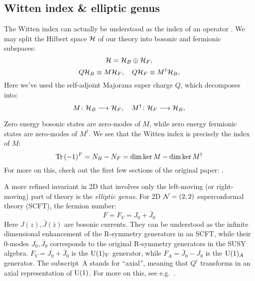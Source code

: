 \documentclass[a4paper
	,10pt
]{article}
\begin{document}
\subsection{Witten index \& elliptic genus}
	
	The Witten index can actually be understood as the index of an operator \cite{Witten:1982df}. We may split the Hilbert space $\mathcal{H}$ of our theory into bosonic and fermionic subspaces:
	\begin{equation}
		\mathcal{H} = \mathcal{H}_B \oplus \mathcal{H}_F,
	\end{equation}
	\vspace{-\baselineskip}
	\begin{equation}
		Q\mathcal{H}_B \equiv M\mathcal{H}_F,
	\quad
		Q\mathcal{H}_F \equiv M^\dagger\mathcal{H}_B,
	\end{equation}
	Here we've used the self-adjoint Majorana super charge $Q$, which decomposes into:
	\begin{equation}
		M\colon \mathcal{H}_B \longrightarrow \mathcal{H}_F,
	\quad
		M^\dagger\colon \mathcal{H}_F \longrightarrow \mathcal{H}_B,
	\end{equation}
	
	Zero energy bosonic states are zero-modes of $M$, while zero energy fermionic states are zero-modes of $M^\dagger$. We see that the Witten index is precisely the index of $M$:
	\begin{equation}
		\Tr\,(-1)^F
		= N_B - N_F
		= \dim \ker M - \dim \ker M^\dagger
	\end{equation}
	For more on this, check out the first few sections of the original paper: \textcite{Witten:1982df}. 
	
	\newparagraph
	A more refined invariant in 2D that involves only the left-moving (or right-moving) part of theory is the \textit{elliptic genus}. For 2D $\mathcal{N} = (2,2)$ superconformal theory (SCFT), the fermion number:
	\begin{equation}
		F = F_V = J_0 + \bar{J}_0
	\end{equation}
	Here $J(z),\bar{J}(\bar{z})$ are bosonic currents. They can be understood as the infinite dimensional enhancement of the R-symmetry generators in an SCFT, while their 0-modes $J_0,\bar{J}_0$ corresponds to the original R-symmetry generators in the SUSY algebra. $F_V = J_0 + \bar{J}_0$ is the $\mathrm{U}(1)_V$ generator, while $F_A = \bar{J}_0 - J_0$ is the $\mathrm{U}(1)_A$ generator. The \mbox{subscript A} stands for ``axial'', meaning that $Q^i$ transforms in an axial representation of $\mathrm{U}(1)$. For more on this, see e.g.~\cite{MauricioStuff}. 
	
\end{document}
